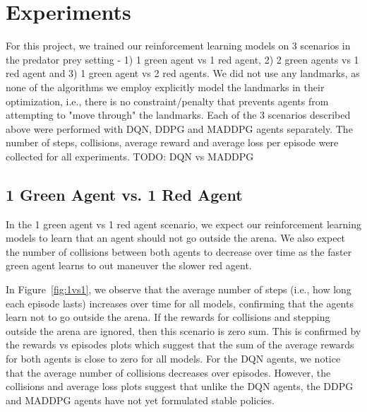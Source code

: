 
\newcommand\graphspacing{-0.5cm}

\section{Experiments}
\label{sec:experiment}

For this project, we trained our reinforcement learning models on 3 scenarios in the predator prey setting - 1) 1 green agent vs 1 red agent, 2) 2 green agents vs 1 red agent and 3) 1 green agent vs 2 red agents. We did not use any landmarks, as none of the algorithms we employ explicitly model the landmarks in their optimization, i.e., there is no constraint/penalty that prevents agents from attempting to "move through" the landmarks. Each of the 3 scenarios described above were performed with DQN, DDPG and MADDPG agents separately. The number of steps, collisions, average reward and average loss per episode were collected for all experiments. TODO: DQN vs MADDPG  

\subsection{1 Green Agent vs. 1 Red Agent}
\label{sec:experiment:1vs1}

In the 1 green agent vs 1 red agent scenario, we expect our reinforcement learning models to learn that an agent should not go outside the arena. We also expect the number of collisions between both agents to decrease over time as the faster green agent learns to out maneuver the slower red agent.

In Figure~\ref{fig:1vs1}, we observe that the average number of steps (i.e., how long each episode lasts) increases over time for all models, confirming that the agents learn not to go outside the arena. If the rewards for collisions and stepping outside the arena are ignored, then this scenario is zero sum. This is confirmed by the rewards vs episodes plots which suggest that the sum of the average rewards for both agents is close to zero for all models. For the DQN agents, we notice that the average number of collisions decreases over episodes. However, the collisions and average loss plots suggest that unlike the DQN agents, the DDPG and MADDPG agents have not yet formulated stable policies.

